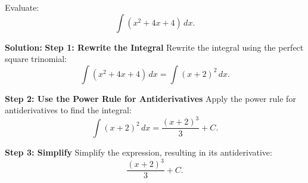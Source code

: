 \documentclass[12pt]{article}
\theoremstyle{beautifulthm}
\begin{document}
\begin{tcolorbox}[colback=examplebg, colframe=red!75!black, title=\textbf{EXAMPLE 5: Find the Integral of the Function}, fonttitle=\bfseries, sharp corners]
Evaluate:
\[
\int (x^2 + 4x + 4) \, dx.
\]


\tcblower
\textbf{Solution:} 
\textbf{Step 1: Rewrite the Integral}  
Rewrite the integral using the perfect square trinomial:
\[
\int (x^2 + 4x + 4) \, dx = \int (x + 2)^2 \, dx.
\]

\textbf{Step 2: Use the Power Rule for Antiderivatives}  
Apply the power rule for antiderivatives to find the integral:
\[
\int (x + 2)^2 \, dx = \frac{(x + 2)^3}{3} + C.
\]

\textbf{Step 3: Simplify}  
Simplify the expression, resulting in its antiderivative:
\[
\frac{(x + 2)^3}{3} + C.
\]
\end{tcolorbox}
\end{document}
